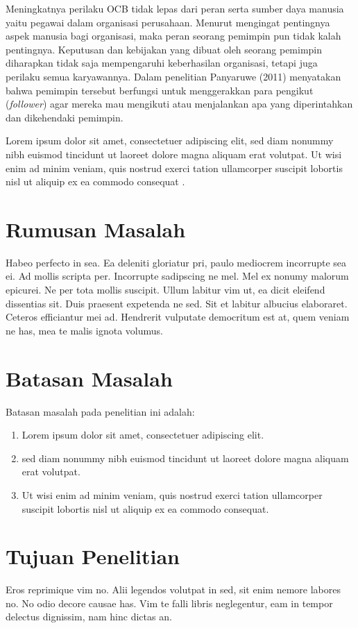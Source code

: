 Meningkatnya perilaku OCB tidak lepas dari peran serta sumber daya manusia yaitu pegawai dalam organisasi perusahaan. Menurut \textcite{miramargaretha2012} mengingat pentingnya aspek manusia bagi organisasi, maka peran seorang pemimpin pun tidak kalah pentingnya. Keputusan dan kebijakan yang dibuat oleh seorang pemimpin diharapkan tidak saja mempengaruhi keberhasilan organisasi, tetapi juga perilaku semua karyawannya. Dalam penelitian Panyaruwe (2011) menyatakan bahwa pemimpin tersebut berfungsi untuk menggerakkan para pengikut (\textit{follower}) agar mereka mau mengikuti atau menjalankan apa yang diperintahkan dan dikehendaki pemimpin.

Lorem ipsum dolor sit amet, consectetuer adipiscing elit, sed diam nonummy nibh euismod tincidunt ut laoreet dolore magna aliquam erat volutpat. Ut wisi enim ad minim veniam, quis nostrud exerci tation ullamcorper suscipit lobortis nisl ut aliquip ex ea commodo consequat \parencite{Raluca2008}.

\section{Rumusan Masalah}
Habeo perfecto in sea. Ea deleniti gloriatur pri, paulo mediocrem incorrupte sea ei. Ad mollis scripta per. Incorrupte sadipscing ne mel. Mel ex nonumy malorum epicurei. Ne per tota mollis suscipit. Ullum labitur vim ut, ea dicit eleifend dissentias sit. Duis praesent expetenda ne sed. Sit et labitur albucius elaboraret. Ceteros efficiantur mei ad. Hendrerit vulputate democritum est at, quem veniam ne has, mea te malis ignota volumus.


\section{Batasan Masalah}
Batasan masalah pada penelitian ini adalah:
\begin{enumerate}
\item Lorem ipsum dolor sit amet, consectetuer adipiscing elit.
\item sed diam nonummy nibh euismod tincidunt ut laoreet dolore magna aliquam erat volutpat.
\item Ut wisi enim ad minim veniam, quis nostrud exerci tation ullamcorper suscipit lobortis nisl ut aliquip ex ea commodo consequat.
\end{enumerate}


\section{Tujuan Penelitian}
Eros reprimique vim no. Alii legendos volutpat in sed, sit enim nemore labores no. No odio decore causae has. Vim te falli libris neglegentur, eam in tempor delectus dignissim, nam hinc dictas an.


